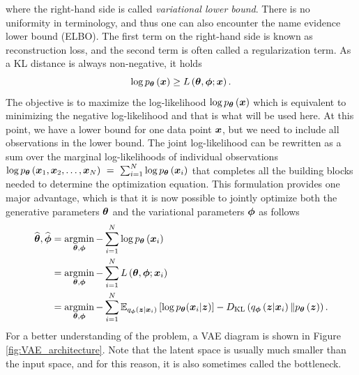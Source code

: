 where the right-hand side is called \emph{variational lower bound}. There is no uniformity in terminology, and thus one can also encounter the name evidence lower bound (ELBO). The first term on the right-hand side is known as reconstruction loss, and the second term is often called a regularization term. As a KL distance is always non-negative, it holds
\begin{equation}
    \log p_{\boldsymbol{\theta}}\left(\boldsymbol{x}\right) \geq L\left(\boldsymbol{\theta},\boldsymbol{\phi}; \boldsymbol{x}\right).
\end{equation}
The objective is to maximize the log-likelihood $\log p_{\boldsymbol{\theta}}\left(\boldsymbol{x}\right)$ which is equivalent to minimizing the negative log-likelihood and that is what will be used here. At this point, we have a lower bound for one data point $\boldsymbol{x}$, but we need to include all observations in the lower bound. The joint log-likelihood can be rewritten as a sum over the marginal log-likelihoods of individual observations $\log p_{\boldsymbol{\theta}}\left(\boldsymbol{x}_1,\boldsymbol{x}_2,\dots,\boldsymbol{x}_N\right)~=~\sum_{i=1}^N\log p_{\boldsymbol{\theta}}\left(\boldsymbol{x}_i\right)$ that completes all the building blocks needed to determine the optimization equation. This formulation provides one major advantage, which is that it is now possible to jointly optimize both the generative parameters $\boldsymbol{\theta}$ and the variational parameters $\boldsymbol{\phi}$ as follows 
\begin{align}
   \widehat{\boldsymbol{\theta}}, \widehat{\boldsymbol{\phi}} &= \mathop{\mathrm{argmin}}_{\boldsymbol{\theta},\boldsymbol{\phi}}-\sum_{i=1}^N\log p_{\boldsymbol{\theta}}\left(\boldsymbol{x}_i\right)\\
   &=\mathop{\mathrm{argmin}}_{\boldsymbol{\theta},\boldsymbol{\phi}}-\sum_{i=1}^N L\left(\boldsymbol{\theta},\boldsymbol{\phi}; \boldsymbol{x}_i\right)\\
  &= \mathop{\mathrm{argmin}}_{\boldsymbol{\theta},\boldsymbol{\phi}}-\sum_{i=1}^N\mathbb{E}_{q_{\boldsymbol{\phi}}\left(\boldsymbol{z}\vert \boldsymbol{x}_i \right)}\left[\log p_{\boldsymbol{\theta}}(\boldsymbol{x}_i\vert \boldsymbol{z}) \right] - D_{\mathrm{KL}}\left(q_{\boldsymbol{\phi}}\left(\boldsymbol{z}\vert\boldsymbol{x}_i \right) \Vert p_{\boldsymbol{\theta}}\left(\boldsymbol{z}\right)\right).\label{eq:VAEloss}
\end{align}
For a better understanding of the problem, a VAE diagram is shown in Figure \ref{fig:VAE_architecture}. Note that the latent space is usually much smaller than the input space, and for this reason, it is also sometimes called the bottleneck. 


